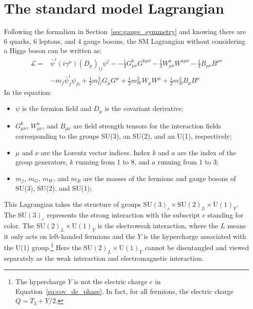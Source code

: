 \section{The standard model Lagrangian}\label{sec:SM_Lagrangian}

Following the formalism in Section~\ref{sec:gauge_symmetry} and knowing there are 6 quarks, 6 leptons, and 4 gauge bosons,
the SM Lagrangian without considering a Higgs boson can be written as:
\begin{equation}\label{eq:SM_Lagrangian}
  \begin{split}
    \mathcal{L} = & \bar{\psi}^{i} (i\gamma^{\mu})(D_{\mu})_{ij}\psi^{j} -
                  - \frac{1}{4} G^{k}_{\mu\nu}G^{k\mu\nu}
                  - \frac{1}{4} W^{a}_{\mu\nu}W^{a\mu\nu}
                  - \frac{1}{4} B_{\mu\nu}B^{\mu\nu} \\
                & - m_{f} \bar{\psi}^{i}_{f} \psi_{fi}
                  + \frac{1}{2} m^{2}_{G} G_{\mu}G^{\mu}
                  + \frac{1}{2} m^{2}_{W} W_{\mu}W^{\mu}
                  + \frac{1}{2} m^{2}_{B} B_{\mu}B^{\mu}
  \end{split}
\end{equation}
In the equation:
\begin{itemize}
  \item $\psi$ is the fermion field and $D_{\mu}$ is the covariant derivative;
  \item $G^{k}_{\mu\nu}$, $W^{a}_{\mu\nu}$, and $B_{\mu\nu}$ are field strength tensors for the interaction fields 
        corresponding to the groups SU(3), an SU(2), and an U(1), respectively;
  \item $\mu$ and $\nu$ are the Lorentz vector indices. Index $k$ and $a$ are the index of the group generators, $k$ running from 1 to 8, and $a$ running from 1 to 3;
  \item $m_{f}$, $m_{G}$, $m_{W}$, and $m_{B}$ are the masses of the fermions and gauge bosons of SU(3), SU(2), and SU(1);  
\end{itemize}


This Lagrangian takes the structure of groups SU$(3)_{c} \times$SU$(2)_{L} \times$U$(1)_{Y}$.
The SU$(3)_{c}$ represents the strong interaction with the subscript $c$ standing for color.
The SU$(2)_{L} \times$U$(1)_{Y}$ is the electroweak interaction, 
where the $L$ means it only acts on left-handed fermions
and the $Y$ is the hypercharge associated with the U(1) group.\footnote{The hypercharge $Y$ is not the electric charge $e$ in Equation~\ref{eq:cov_de_phase}.
In fact, for all fermions, the electric charge $Q = T_{3} + Y/2$.}
Here the SU$(2)_{L} \times$U$(1)_{Y}$ cannot be disentangled and viewed separately as the weak interaction and electromagnetic interaction.

